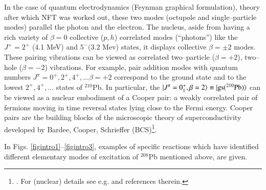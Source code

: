 In the case of quantum electrodynamics (Feynman graphical formulation), theory after which NFT was worked out, these two modes (octupole and single--particle modes) parallel the photon and the electron. The nucleus, aside from having a rich variety of $\beta=0$ collective ($p,h$) correlated modes (``photons'') like the $J^+=2^+$ (4.1 MeV) and $5^-(3.2$ Mev) states, it displays collective $\beta=\pm2$ modes. These pairing vibrations can be viewed as correlated two--particle ($\beta=+2$), two--hole ($\beta=-2$) vibrations. For example, pair addition modes with quantum numbers $J^\pi=0^+,2^+,4^+,\dots\beta=+2$ correspond to the ground state and to the lowest $2^+,4^+,\dots$ states of $^{210}$Pb. In particular,  the $|{J^\pi=0^+_1,\beta=2} \rangle\equiv |{\text{gs}(^{210}\text{Pb})} \rangle$ can be viewed as a nuclear embodiment of a Cooper pair: a weakly correlated pair of fermions moving in time reversal states lying close to the Fermi energy. Cooper pairs are the building blocks of the microscopic theory of superconductivity developed by Bardee, Cooper, Schrieffer (BCS)\footnote{\cite{Bardeen:57a,Bardeen:57b}. For (nuclear) details see e.g. \cite{Brink:05} and references therein.}.


In Figs. \ref{figintro1}--\ref{figintro3}, examples of specific reactions which have identified different elementary modes of excitation of $^{208}$Pb mentioned above, are given.

